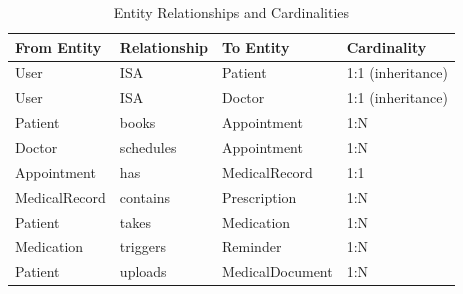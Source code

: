\documentclass[11pt,a4paper]{article}
\begin{document}
\begin{table}[h]
\centering
\begin{tabular}{|l|l|l|l|}
\hline
\textbf{From Entity} & \textbf{Relationship} & \textbf{To Entity} & \textbf{Cardinality} \\
\hline
User & ISA & Patient & 1:1 (inheritance) \\
User & ISA & Doctor & 1:1 (inheritance) \\
Patient & books & Appointment & 1:N \\
Doctor & schedules & Appointment & 1:N \\
Appointment & has & MedicalRecord & 1:1 \\
MedicalRecord & contains & Prescription & 1:N \\
Patient & takes & Medication & 1:N \\
Medication & triggers & Reminder & 1:N \\
Patient & uploads & MedicalDocument & 1:N \\
\hline
\end{tabular}
\caption{Entity Relationships and Cardinalities}
\label{tab:relationships}
\end{table}


    
    
    
\end{document}
